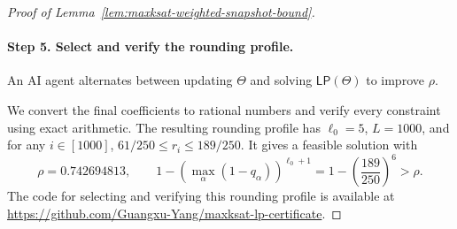 \begin{proof}[Proof of Lemma~\ref{lem:maxksat-weighted-snapshot-bound}]
\paragraph{Step 5. Select and verify the rounding profile.}
An AI agent alternates between updating $\Theta$ and solving $\mathsf{LP}(\Theta)$ to improve $\rho$.



We convert the final coefficients to rational numbers and verify every constraint using exact arithmetic. The resulting rounding profile has $\ell_0=5$, $L=1000$, and for any $i\in [1000]$,  $61/250\le r_i\le189/250$. It gives a feasible solution with
\[
  \rho=0.742694813,
  \qquad 1-\left(\max_\alpha(1-q_\alpha)\right)^{\ell_0+1} =  1-\left(\frac{189}{250}\right)^6>
  \rho.
\]
The code for selecting and verifying this rounding profile is available at \url{https://github.com/Guangxu-Yang/maxksat-lp-certificate}.
\end{proof}
